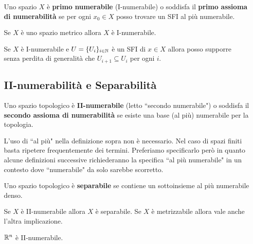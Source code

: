 \begin{multicols*}{2}
\begin{definition}[I-numerabilità]
Uno spazio $X$ è \textbf{primo numerabile} (I-numerabile) o soddisfa il \textbf{primo assioma di numerabilità} se per ogni $x_0\in X$ posso trovare un SFI al più numerabile.
\end{definition}

\begin{proposition}\label{MetricoEINumerabile}
Se $X$ è uno spazio metrico allora $X$ è I-numerabile.
\end{proposition}

\begin{lemma}\label{LemmaINumerabile}
Se $X$ è I-numerabile e $U=\{U_i\}_{i\in \mathbb{N}}$ è un SFI di $x\in X$ allora posso supporre senza perdita di generalità che $U_{i+1}\subseteq U_i$ per ogni $i$.
\end{lemma}

\subsection{II-numerabilità e Separabilità}
\begin{definition}[II-numerabilità]
Uno spazio topologico è \textbf{II-numerabile} (letto ``secondo numerabile") o soddisfa il \textbf{secondo assioma di numerabilità} se esiste una base (al più) numerabile per la topologia.
\end{definition}
\begin{remark}
L'uso di ``al più" nella definizione sopra non è necessario. Nel caso di spazi finiti basta ripetere frequentemente dei termini. Preferiamo specificarlo però in quanto alcune definizioni successive richiederanno la specifica ``al più numerabile" in un contesto dove ``numerabile" da solo sarebbe scorretto.
\end{remark}
\begin{definition}[Separabilità]
Uno spazio topologico è \textbf{separabile} se contiene un sottoinsieme al più numerabile denso.
\end{definition}
\begin{theorem}\label{IINumerabileESeparabileEInMetricoCoincidono}
Se $X$ è II-numerabile allora $X$ è separabile. Se $X$ è metrizzabile allora vale anche l'altra implicazione.
\end{theorem}
\begin{corollary}
$\mathbb{R}^n$ è II-numerabile.
\end{corollary}


\end{multicols*}
